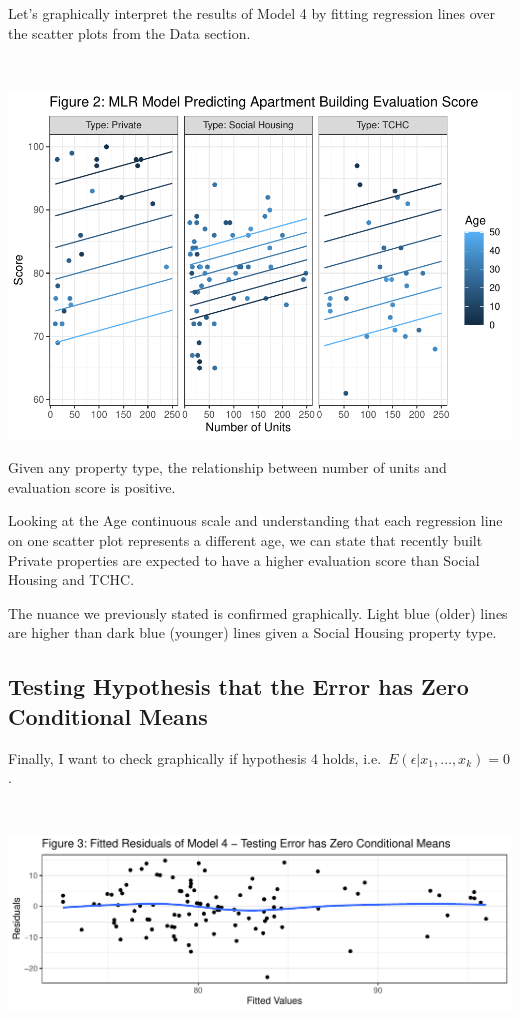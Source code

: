 \documentclass[
]{article}
\begin{document}
Let's graphically interpret the results of Model 4 by fitting regression
lines over the scatter plots from the Data section.

~

\includegraphics{A2_files/figure-latex/unnamed-chunk-8-1.pdf}

Given any property type, the relationship between number of units and
evaluation score is positive.

Looking at the Age continuous scale and understanding that each
regression line on one scatter plot represents a different age, we can
state that recently built Private properties are expected to have a
higher evaluation score than Social Housing and TCHC.

The nuance we previously stated is confirmed graphically. Light blue
(older) lines are higher than dark blue (younger) lines given a Social
Housing property type.

\hypertarget{testing-hypothesis-that-the-error-has-zero-conditional-means}{%
\subsection{Testing Hypothesis that the Error has Zero Conditional
Means}\label{testing-hypothesis-that-the-error-has-zero-conditional-means}}

Finally, I want to check graphically if hypothesis 4 holds,
i.e.~\emph{\(E(\epsilon| x_1,…, x_k) = 0\)}.

~

\includegraphics{A2_files/figure-latex/unnamed-chunk-9-1.pdf}
\end{document}
